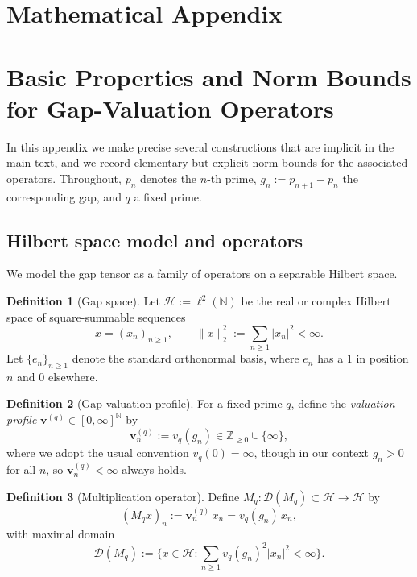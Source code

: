 \documentclass[11pt]{article}
\theoremstyle{definition}
\newtheorem{definition}{Definition}[section]
\theoremstyle{plain}
\theoremstyle{remark}
\newcommand{\1}{\mathbb{1}}
\begin{document}
\appendix
\section*{Mathematical Appendix}

\section{Basic Properties and Norm Bounds for Gap-Valuation Operators}

In this appendix we make precise several constructions that are implicit in the main text, and we record elementary but explicit norm bounds for the associated operators. Throughout, \(p_n\) denotes the \(n\)-th prime, \(g_n := p_{n+1} - p_n\) the corresponding gap, and \(q\) a fixed prime.

\subsection{Hilbert space model and operators}

We model the gap tensor as a family of operators on a separable Hilbert space.

\begin{definition}[Gap space]
Let \(\mathcal{H} := \ell^2(\mathbb{N})\) be the real or complex Hilbert space of square-summable sequences
\[
  x = (x_n)_{n\ge 1},\qquad \|x\|_2^2 := \sum_{n\ge 1} |x_n|^2 < \infty.
\]
Let \(\{e_n\}_{n\ge 1}\) denote the standard orthonormal basis, where \(e_n\) has a \(1\) in position \(n\) and \(0\) elsewhere.
\end{definition}

\begin{definition}[Gap valuation profile]
For a fixed prime \(q\), define the \emph{valuation profile} \(\mathbf{v}^{(q)} \in [0,\infty]^{\mathbb{N}}\) by
\[
  \mathbf{v}^{(q)}_n := v_q(g_n) \in \mathbb{Z}_{\ge 0}\cup\{\infty\},
\]
where we adopt the usual convention \(v_q(0) = \infty\), though in our context \(g_n>0\) for all \(n\), so \(\mathbf{v}^{(q)}_n < \infty\) always holds.
\end{definition}

\begin{definition}[Multiplication operator]
Define \(M_q: \mathcal{D}(M_q) \subset \mathcal{H} \to \mathcal{H}\) by
\[
  (M_q x)_n := \mathbf{v}^{(q)}_n\,x_n = v_q(g_n)\,x_n,
\]
with maximal domain
\[
  \mathcal{D}(M_q) := \big\{x\in\mathcal{H} : \sum_{n\ge 1} v_q(g_n)^2 |x_n|^2 < \infty \big\}.
\]
\end{definition}
\end{document}
